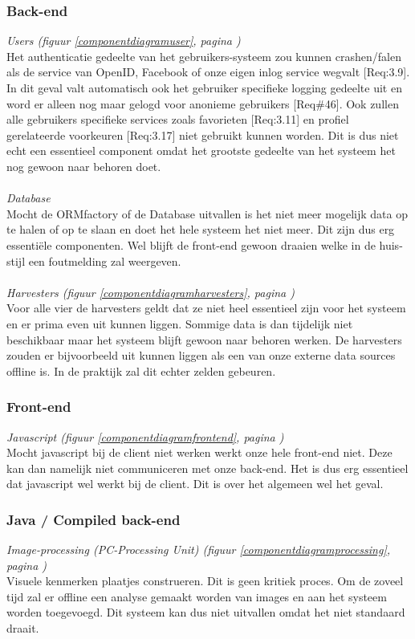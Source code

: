 \documentclass[a4paper,10pt]{article}
\begin{document}
		\subsubsection{Back-end}
		\textit{Users (figuur \ref{componentdiagramuser}, pagina \pageref{componentdiagramuser})} \\
		Het authenticatie gedeelte van het gebruikers-systeem zou kunnen crashen/falen als de service van OpenID, Facebook of onze eigen inlog service wegvalt [Req:3.9]. In dit geval valt automatisch ook het gebruiker specifieke logging gedeelte uit en word er alleen nog maar gelogd voor anonieme gebruikers [Req\#46]. Ook zullen alle gebruikers specifieke services zoals favorieten [Req:3.11] en profiel gerelateerde voorkeuren [Req:3.17] niet gebruikt kunnen worden. Dit is dus niet echt een essentieel component omdat het grootste gedeelte van het systeem het nog gewoon naar behoren doet.\\ 
		\\ \textit{Database} \\
		Mocht de ORMfactory of de Database uitvallen is het niet meer mogelijk data op te halen of op te slaan en doet het hele systeem het niet meer. Dit zijn dus erg essenti\"ele componenten. Wel blijft de front-end gewoon draaien welke in de huis-stijl een foutmelding zal weergeven.\\ 
		\\ \textit{Harvesters (figuur \ref{componentdiagramharvesters}, pagina \pageref{componentdiagramuser})} \\
		Voor alle vier de harvesters geldt dat ze niet heel essentieel zijn voor het systeem en er prima even uit kunnen liggen. Sommige data is dan tijdelijk niet beschikbaar maar het systeem blijft gewoon naar behoren werken. De harvesters zouden er bijvoorbeeld uit kunnen liggen als een van onze externe data sources offline is. In de praktijk zal dit echter zelden gebeuren.
		
		\subsubsection{Front-end}
		\textit{Javascript (figuur \ref{componentdiagramfrontend}, pagina \pageref{componentdiagramfrontend})} \\
		Mocht javascript bij de client niet werken werkt onze hele front-end niet. Deze kan dan namelijk niet communiceren met onze back-end. Het is dus erg essentieel dat javascript wel werkt bij de client. Dit is over het algemeen wel het geval.
		\subsubsection{Java / Compiled back-end}
		\textit{Image-processing (PC-Processing Unit) (figuur \ref{componentdiagramprocessing}, pagina \pageref{componentdiagramprocessing})} \\
		Visuele kenmerken plaatjes construeren. Dit is geen kritiek proces. Om de zoveel tijd zal er offline een analyse gemaakt worden van images en aan het systeem worden toegevoegd. Dit systeem kan dus niet uitvallen omdat het niet standaard draait.	
	
\end{document}
